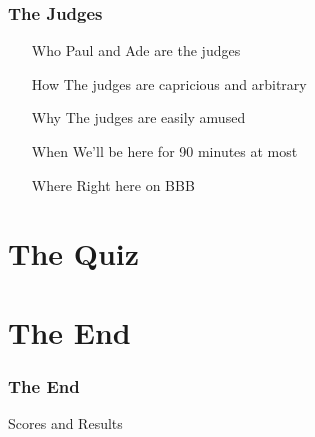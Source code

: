 \documentclass[t,compress,aspectratio=169]{beamer}
\begin{document}
\begin{frame}
    \frametitle{The Judges}
    \begin{itemize}
        \item[Who] Paul and Ade are the judges
        \item[How] The judges are capricious and arbitrary
        \item[Why] The judges are easily amused
        \item[When] We'll be here for 90 minutes at most
        \item[Where] Right here on BBB
    \end{itemize}
\end{frame}


\section*{The Quiz}









\section*{The End}
\begin{frame}
    \frametitle{The End}
    \vspace{0.3cm}
    \begin{block}{}
        \centering\begin{Huge}Scores and Results\end{Huge}
    \end{block}
\end{frame}


% 
% 
\end{document}
